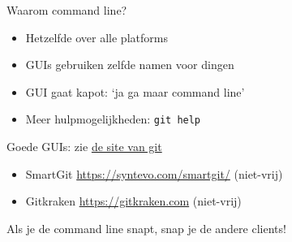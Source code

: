 \begin{frame}{Waarom command line?}
	\begin{itemize}
		\item Hetzelfde over alle platforms
		\item GUIs gebruiken zelfde namen voor dingen
		\item GUI gaat kapot: `ja ga maar command line'
		\item Meer hulpmogelijkheden: \texttt{git help}
	\end{itemize}
	Goede GUIs: zie \href{https://git-scm.com/downloads/guis}{de site van git}
	\begin{itemize}
		\item SmartGit \url{https://syntevo.com/smartgit/} (niet-vrij)
		\item Gitkraken \url{https://gitkraken.com} (niet-vrij)
	\end{itemize}
	Als je de command line snapt, snap je de andere clients!
\end{frame}

